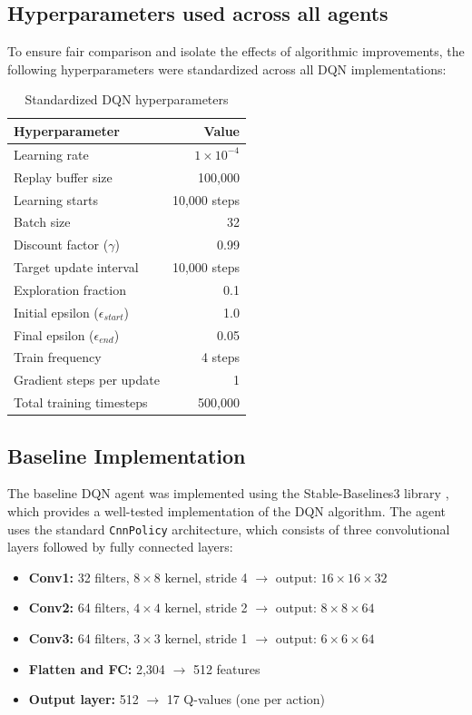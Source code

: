 \documentclass[twocolumn]{article}
\begin{document}
\subsection*{Hyperparameters used across all agents}
To ensure fair comparison and isolate the effects of algorithmic improvements, the following hyperparameters were standardized across all DQN implementations:

\begin{table}[H]
\centering
\begin{tabular}{lr}
\toprule
\textbf{Hyperparameter} & \textbf{Value} \\
\midrule
Learning rate & $1 \times 10^{-4}$ \\
Replay buffer size & 100,000 \\
Learning starts & 10,000 steps \\
Batch size & 32 \\
Discount factor ($\gamma$) & 0.99 \\
Target update interval & 10,000 steps \\
Exploration fraction & 0.1 \\
Initial epsilon ($\epsilon_{start}$) & 1.0 \\
Final epsilon ($\epsilon_{end}$) & 0.05 \\
Train frequency & 4 steps \\
Gradient steps per update & 1 \\
Total training timesteps & 500,000 \\
\bottomrule
\end{tabular}
\caption{Standardized DQN hyperparameters}
\end{table}

\subsection*{Baseline Implementation}

The baseline DQN agent was implemented using the Stable-Baselines3 library \parencite{stable-baselines3}, which provides a well-tested implementation of the DQN algorithm. The agent uses the standard \texttt{CnnPolicy} architecture, which consists of three convolutional layers followed by fully connected layers:

\begin{itemize}
    \item \textbf{Conv1:} 32 filters, $8 \times 8$ kernel, stride 4 $\rightarrow$ output: $16 \times 16 \times 32$
    \item \textbf{Conv2:} 64 filters, $4 \times 4$ kernel, stride 2 $\rightarrow$ output: $8 \times 8 \times 64$
    \item \textbf{Conv3:} 64 filters, $3 \times 3$ kernel, stride 1 $\rightarrow$ output: $6 \times 6 \times 64$
    \item \textbf{Flatten and FC:} 2,304 $\rightarrow$ 512 features
    \item \textbf{Output layer:} 512 $\rightarrow$ 17 Q-values (one per action)
\end{itemize}
\end{document}
